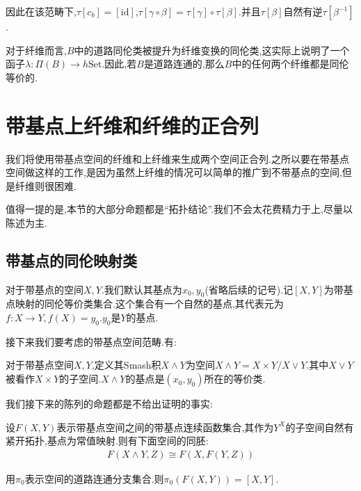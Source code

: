 因此在该范畴下,$\tau[c_b]=[\mathrm{id}]$,$\tau[\gamma \circ \beta]=\tau[\gamma]\circ \tau [\beta]$.并且$\tau[\beta]$自然有逆$\tau[\beta^{-1}]$.

\begin{theorem}
    对于纤维而言,$B$中的道路同伦类被提升为纤维变换的同伦类,这实际上说明了一个函子$\lambda:\Pi(B)\to h\mathrm{Set}$.因此,若$B$是道路连通的,那么$B$中的任何两个纤维都是同伦等价的.
\end{theorem}

\chapter{带基点上纤维和纤维的正合列}
我们将使用带基点空间的纤维和上纤维来生成两个空间正合列.之所以要在带基点空间做这样的工作,是因为虽然上纤维的情况可以简单的推广到不带基点的空间,但是纤维则很困难.

值得一提的是,本节的大部分命题都是“拓扑结论”.我们不会太花费精力于上,尽量以陈述为主.
\section{带基点的同伦映射类}
对于带基点的空间$X,Y$.我们默认其基点为$x_0,y_0$(省略后续的记号).记$[X,Y]$为带基点映射的同伦等价类集合.这个集合有一个自然的基点,其代表元为$f:X \to Y,f(X)=y_0$.$y_0$是$Y$的基点.

接下来我们要考虑的带基点空间范畴.有:
\begin{definition}
    对于带基点空间$X,Y$,定义其Smash积$X \wedge Y$为空间$X \wedge Y=X \times Y/X \vee Y$.其中$X \vee Y$被看作$X \times Y$的子空间.$X\wedge Y$的基点是$(x_0,y_0)$所在的等价类.
\end{definition}
我们接下来的陈列的命题都是不给出证明的事实:
\begin{proposition}
    设$F(X,Y)$表示带基点空间之间的带基点连续函数集合,其作为$Y^X$的子空间自然有紧开拓扑,基点为常值映射.则有下面空间的同胚:
    \begin{align*}
        F(X \wedge Y,Z)\cong F(X,F(Y,Z))
    \end{align*}
\end{proposition}
\begin{proposition}
    用$\pi_0$表示空间的道路连通分支集合.则$\pi_0(F(X,Y))=[X,Y]$.
\end{proposition}
